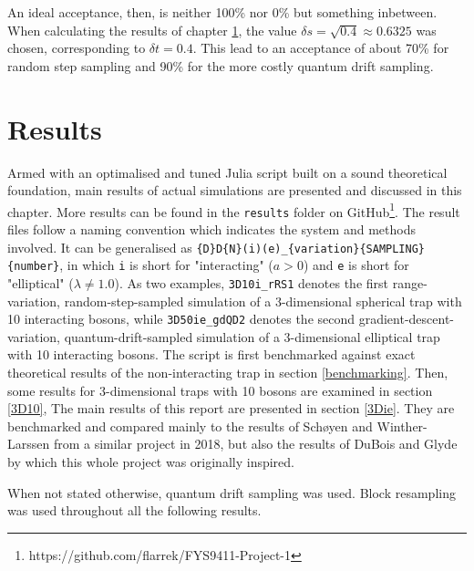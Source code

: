 \documentclass[a4paper,8pt]{article}
\begin{document}
\begin{multicols}{2}
An ideal acceptance, then, is neither 100\% nor 0\% but something inbetween. When calculating the results of chapter \ref{results}, the value ${\delta s = \sqrt{0.4} \approx 0.6325}$ was chosen, corresponding to $\delta t = 0.4$. This lead to an acceptance of about 70\% for random step sampling and 90\% for the more costly quantum drift sampling. 



\section{Results}\label{results}
Armed with an optimalised and tuned Julia script built on a sound theoretical foundation, main results of actual simulations are presented and discussed in this chapter. More results can be found in the \texttt{results} folder on GitHub\footnote{https://github.com/flarrek/FYS9411-Project-1}. The result files follow a naming convention which indicates the system and methods involved. It can be generalised as \texttt{\{D\}D\{N\}(i)(e)\_\{variation\}\{SAMPLING\}\{number\}}, in which \texttt{i} is short for "interacting" ($a > 0$) and \texttt{e} is short for "elliptical" ($\lambda \neq 1.0$). As two examples, \texttt{3D10i\_rRS1} denotes the first range-variation, random-step-sampled simulation of a 3-dimensional spherical trap with 10 interacting bosons, while \texttt{3D50ie\_gdQD2} denotes the second gradient-descent-variation, quantum-drift-sampled simulation of a 3-dimensional elliptical trap with 10 interacting bosons. The script is first benchmarked against exact theoretical results of the non-interacting trap in section \ref{benchmarking}. Then, some results for 3-dimensional traps with 10 bosons are examined in section \ref{3D10}, The main results of this report are presented in section \ref{3Die}. They are benchmarked and compared mainly to the results of Schøyen and Winther-Larssen\cite{SWL} from a similar project in 2018, but also the results of DuBois and Glyde\cite{DBG} by which this whole project was originally inspired.

When not stated otherwise, quantum drift sampling was used. Block resampling was used throughout all the following results.


\end{multicols}
\end{document}
